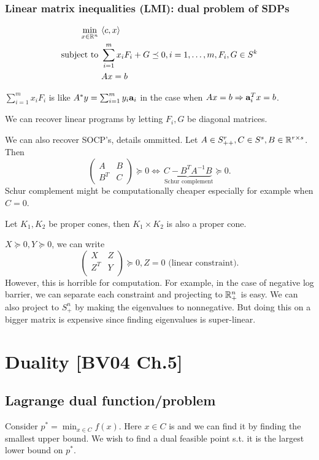 \documentclass[class=article,crop=false]{standalone}
\begin{document}
\subsubsection{Linear matrix inequalities (LMI): dual problem of SDPs}
\begin{align*}
\min_{x \in \mathbb{R}^{n}}\ & \langle c,x \rangle \\
\text{subject to } &\sum_{ i= 1}^{ m} x_i F_i + G \preceq 0, i = 1,\ldots,m, F_i, G \in S^{k} \\
& Ax=b
\end{align*}
\begin{note}
	$ \sum_{ i= 1}^{ m} x_i F_i$ is like $ A^* y = \sum_{ i= 1}^{ m} y_i {\mathbf{a}}_i$ in the case when $ Ax=b \Rightarrow {\mathbf{a}}_i^{T}x=b$.
\end{note}

\begin{remark}
We can recover linear programs by letting $ F_i,G$ be diagonal matrices.
\end{remark}

\begin{remark}
We can also recover SOCP's, details ommitted. Let $ A \in S_{++}^{r}, C \in S^{s}, B \in \mathbb{R}^{r \times s}$. Then
\[
	\begin{pmatrix} A&B\\B^{T}&C \end{pmatrix} \succeq 0 \iff \underbrace{ C-B^{T}A^{-1}B}_{ \text{ Schur complement} } \succeq 0
.\]
Schur complement might be computationally cheaper especially for example when $ C =0$.
\end{remark}

Let $ K_1, K_2$ be proper cones, then $ K_1 \times K_2$ is also a proper cone.
\begin{eg}
$ X \succeq 0, Y \succeq 0$, we can write
\[
	\begin{pmatrix} X&Z\\Z^{T}&Y\\ \end{pmatrix} \succeq 0, Z=0 \text{ (linear constraint)} 
.\] 
However, this is horrible for computation. For example, in the case of negative log barrier, we can separate each constraint and projecting to $ \mathbb{R}_{+}^{n}$ is easy. We can also project to $ S_{+}^{n}$ by making the eigenvalues to nonnegative. But doing this on a bigger matrix is expensive since finding eigenvalues is super-linear.
\end{eg}

\newpage
\section{Duality [BV04 Ch.5]}
\subsection{Lagrange dual function/problem}

Consider $ p^* = \min_{x \in C} f(x)$. Here $ x \in C$ is  and we can find it by finding the smallest upper bound. We wish to find a dual feasible point s.t. it is the largest lower bound on  $ p^* $. 
\end{document}
